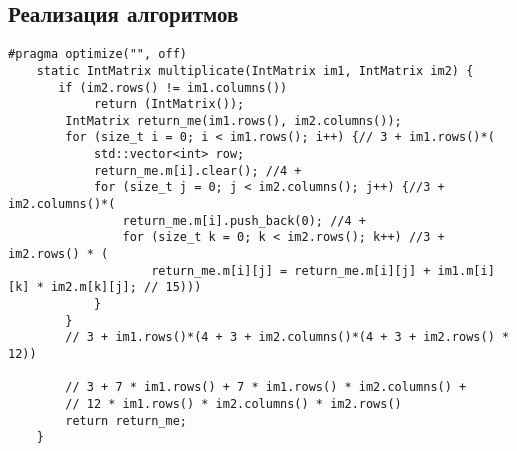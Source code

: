 \documentclass[a4paper, 14pt]{article}
\begin{document}
	\newpage
	\subsection{Реализация алгоритмов}
	
	\begin{lstlisting}[label=matrix-lev,caption=Классическая реализация умножения матриц]
   #pragma optimize("", off)
    static IntMatrix multiplicate(IntMatrix im1, IntMatrix im2) {
       if (im2.rows() != im1.columns())
            return (IntMatrix());
        IntMatrix return_me(im1.rows(), im2.columns());
        for (size_t i = 0; i < im1.rows(); i++) {// 3 + im1.rows()*(
            std::vector<int> row;
            return_me.m[i].clear(); //4 +
            for (size_t j = 0; j < im2.columns(); j++) {//3 + im2.columns()*(
                return_me.m[i].push_back(0); //4 +
                for (size_t k = 0; k < im2.rows(); k++) //3 + im2.rows() * (
                    return_me.m[i][j] = return_me.m[i][j] + im1.m[i][k] * im2.m[k][j]; // 15)))
            }
        }
        // 3 + im1.rows()*(4 + 3 + im2.columns()*(4 + 3 + im2.rows() * 12))

        // 3 + 7 * im1.rows() + 7 * im1.rows() * im2.columns() +
        // 12 * im1.rows() * im2.columns() * im2.rows()
        return return_me;
    }
	\end{lstlisting}
	
\end{document}
